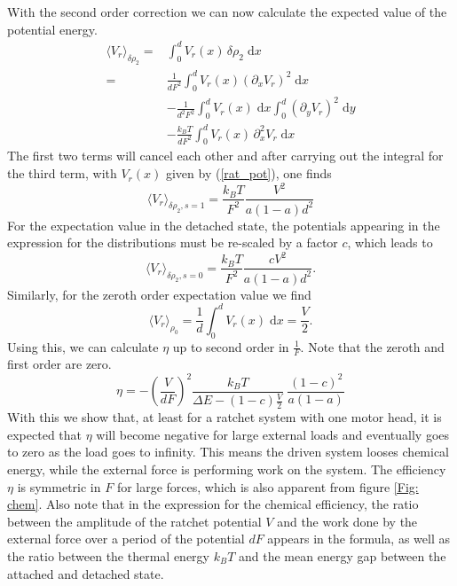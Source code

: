 \documentclass[aps,pre,twocolumn,showpacs,showkeys]{revtex4-1}
\newcommand{\rmd}{{\mathrm d}}
\begin{document}
With the second order correction we can now calculate the expected value of the potential energy.
\begin{align*}
\langle V_r \rangle_{\delta\rho_2} 
=& \int_0^d V_r(x) \, \delta\rho_2 \; \rmd x \\
=& \frac{1}{d F^2} \int_0^d V_r(x) \left(\partial_x V_r \right)^2 \; \rmd x  \\
&- \frac{1}{d^2 F^2} \int_0^d V_r(x) \; \rmd x \int_0^d \left( \partial_y V_r \right)^2 \; \rmd y \\
&- \frac{k_B T}{d F^2} \int_0^d V_r(x) \, \partial_x^2 V_r \; \rmd x
\end{align*}
The first two terms will cancel each other and after carrying out the integral for the third term, with $V_r(x)$ given by (\ref{rat_pot}), one finds 
\begin{equation}
\langle V_r \rangle_{ \delta\rho_2, s=1} = \frac{k_B T}{F^2} \frac{V^2}{a \left(1-a\right) d^2 }
\end{equation}
For the expectation value in the detached state, the potentials appearing in the expression for the distributions must be re-scaled by a factor $c$, which leads to
\begin{equation}
\langle V_r \rangle_{\delta\rho_2, s=0} = \frac{k_B T}{F^2} \frac{c V^2}{a \left(1-a\right) d^2 } .
\end{equation}
Similarly, for the zeroth order expectation value we find
\begin{equation}
\langle V_r \rangle_{\rho_0} = \frac{1}{d} \int_0^d V_r(x) \; \rmd x = \frac{V}{2} .
\end{equation}
Using this, we can calculate $\eta$ up to second order in $\frac{1}{F}$. 
Note that the zeroth and first order are zero.
\begin{equation}
\eta = -\left( \frac{V}{d F} \right)^2 \frac{k_B T} { \Delta E - (1-c) \frac{V}{2} } \; \frac{ \left(1-c\right)^2 }{ a (1-a) }
\end{equation}
With this we show that, at least for a ratchet system with one motor head, it is expected that $\eta$ will become negative for large external loads and eventually goes to zero as the load goes to infinity. 
This means the driven system looses chemical energy, while the external force is performing work on the system. 
The efficiency $\eta$ is symmetric in $F$ for large forces, which is also apparent from figure \ref{Fig: chem}. 
Also note that in the expression for the chemical efficiency, the ratio between the amplitude of the ratchet potential $V$ and the work done by the external force over a period of the potential $d F$ appears in the formula, as well as the ratio between the thermal energy $k_B T$ and the mean energy gap between the attached and detached state. 
\end{document}

